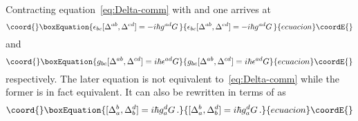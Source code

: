 \documentclass[a4paper,12pt]{amsart}
\numberwithin{equation}{section}
\providecommand{\commut}[2]{[#1,#2]}
\begin{document}
Contracting equation~\eqref{eq:Delta-comm} with \coordHE{}
and \coordHE{} one arrives at
\begin{equation}\coord{}\boxEquation{
  \epsilon_{bc}\commut{\Delta^{ab}}{\Delta^{cd}}=- i\hbar g^{ad} G\,
}{
  \epsilon_{bc}\commut{\Delta^{ab}}{\Delta^{cd}}=- i\hbar g^{ad} G\,
}{ecuacion}\coordE{}\end{equation}
and
\begin{equation}\coord{}\boxEquation{
  g_{bc}\commut{\Delta^{ab}}{\Delta^{cd}}= i\hbar \epsilon^{ad} G
}{
  g_{bc}\commut{\Delta^{ab}}{\Delta^{cd}}= i\hbar \epsilon^{ad} G
}{ecuacion}\coordE{}\end{equation}
respectively. The later equation is not equivalent to~\eqref{eq:Delta-comm}
while the former is in fact equivalent. It can also be rewritten
in terms of \coordHE{} as
\begin{equation}\coord{}\boxEquation{
\commut{\Delta_a^b}{\Delta^d_b}= i\hbar g_a^d G\,.
}{
\commut{\Delta_a^b}{\Delta^d_b}= i\hbar g_a^d G\,.
}{ecuacion}\coordE{}\end{equation}


\bigskip
\end{document}
